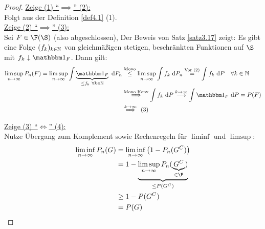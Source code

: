 \begin{proof}
\underline{Zeige (1) ``$\implies$'' (2):}\\
Folgt aus der Definition \ref{def4.1} (1).\\

\underline{Zeige (2) ``$\implies$'' (3):}\\
Sei $F\in\F(\S)$ (also abgeschlossen), Der Beweis von Satz \ref{satz3.17} zeigt: Es gibt eine Folge $(f_k)_{k\in\mathbb{N}}$ von gleichmäßigen stetigen, beschränkten Funktionen auf $\S$ mit $f_k\downarrow\indi_F$. Dann gilt:
\begin{align*}
\limsup\limits_{n\to\infty} P_n(F)
=\limsup\limits_{n\to\infty}\int\limits\underbrace{\indi_F}_{\leq f_k~\forall k\in\N}\d P_n
&\stackrel{\text{Mono}}{\leq}
\limsup\limits_{n\to\infty}\int\limits f_k\d P_n
\stackrel{\text{Vor (2)}}{=}
\int\limits f_k\d P\quad\forall k\in\N\\
&\stackrel{\text{Mono Konv}}{\implies}
\int\limits f_k\d P\stackrel{k\to\infty}{\longrightarrow}
\int\limits\indi_F\d P=P(F)\\
&\stackrel{k\to\infty}{\implies}~(3)
\end{align*}

\underline{Zeige (3) ``$\Longleftrightarrow$'' (4):}\\
Nutze Übergang zum Komplement sowie Rechenregeln für $\liminf$ und $\limsup$:
\begin{align*}
\liminf\limits_{n\to\infty} P_n(G)
&=\liminf\limits_{n\to\infty} \big(1-P_n(G^C)\big)\\
&=1-\underbrace{\limsup\limits_{n\to\infty} P_n(\underbrace{G^C}_{\in\F})}_{\leq P(G^C)}\\
&\geq 1-P(G^C)\\
&=P(G)
\end{align*}


\end{proof}

